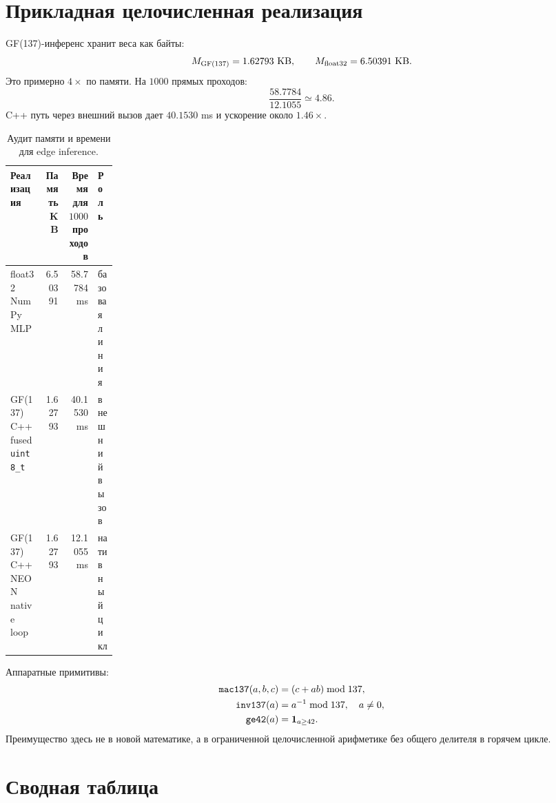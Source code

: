 \documentclass[11pt]{article}
\begin{document}
\section{Прикладная целочисленная реализация}

GF(137)-инференс хранит веса как байты:
\begin{equation}
    M_{\rm GF(137)}=1.62793~{\rm KB},
    \qquad
    M_{\rm float32}=6.50391~{\rm KB}.
\end{equation}
Это примерно $4\times$ по памяти.  На $1000$ прямых проходов:
\begin{equation}
    \frac{58.7784}{12.1055}\simeq4.86.
\end{equation}
C++ путь через внешний вызов дает $40.1530$ ms и ускорение около $1.46\times$.

\begin{table}[h]
\centering
\caption{Аудит памяти и времени для edge inference.}
\small
\setlength{\tabcolsep}{3pt}
\begin{tabularx}{\linewidth}{@{}YrrP{0.18\linewidth}@{}}
\toprule
Реализация & Память KB & Время для $1000$ проходов & Роль \\
\midrule
float32 NumPy MLP & 6.50391 & 58.7784 ms & базовая линия \\
GF(137) C++ fused \texttt{uint8\_t} & 1.62793 & 40.1530 ms & внешний вызов \\
GF(137) C++ NEON native loop & 1.62793 & 12.1055 ms & нативный цикл \\
\bottomrule
\end{tabularx}
\end{table}

Аппаратные примитивы:
\begin{align}
    {\tt mac137}(a,b,c)&=(c+ab)\bmod137,\\
    {\tt inv137}(a)&=a^{-1}\bmod137,\quad a\ne0,\\
    {\tt ge42}(a)&=\mathbf{1}_{a\ge42}.
\end{align}
Преимущество здесь не в новой математике, а в ограниченной целочисленной
арифметике без общего делителя в горячем цикле.

\section{Сводная таблица}
\end{document}
